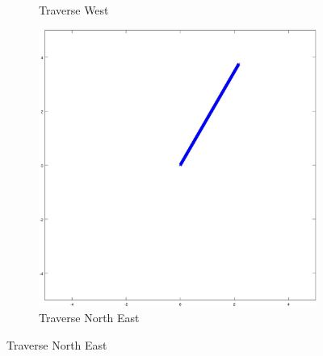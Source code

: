 \documentclass{article}
\begin{document}
\begin{figure}[H]
\begin{subfigure}[b]{0.32\linewidth}
		\caption{Traverse West}
	\end{subfigure}
	\begin{subfigure}[b]{0.32\linewidth}
		\includegraphics[width=\textwidth]{images/traverse_north_east.jpg}
		\caption{Traverse North East}
	\end{subfigure}
	

\end{figure}
\end{document}
